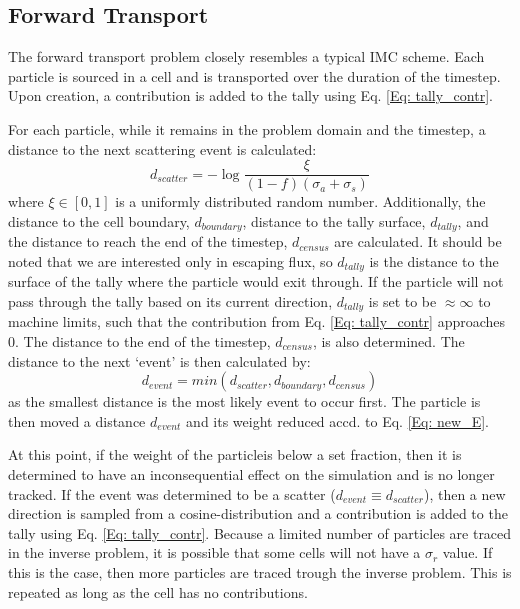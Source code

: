 \subsection{Forward Transport}
The forward transport problem closely resembles a typical IMC scheme. Each particle is sourced in a cell and is transported over the duration of the timestep. Upon creation, a contribution is added to the tally using Eq. \ref{Eq: tally_contr}. 

For each particle, while it remains in the problem domain and the timestep, a distance to the next scattering event is calculated:
\begin{equation}
d_{scatter} = -\log{\frac{\xi}{(1 - f)(\sigma_{a} + \sigma_{s})}}
\end{equation}
where $\xi \in [0,1]$ is a uniformly distributed random number. Additionally, the distance to the cell boundary, $d_{boundary}$, distance to the tally surface, $d_{tally}$, and the distance to reach the end of the timestep, $d_{census}$ are calculated. It should be noted that we are interested only in escaping flux, so $d_{tally}$ is the distance to the surface of the tally where the particle would exit through. If the particle will not pass through the tally based on its current direction, $d_{tally}$ is set to be $\approx \infty$ to machine limits, such that the contribution from Eq. \ref{Eq: tally_contr} approaches $0$. The distance to the end of the timestep, $d_{census}$, is also determined. The distance to the next `event' is then calculated by:
\begin{equation}
d_{event} = min(d_{scatter}, d_{boundary}, d_{census})
\end{equation}
as the smallest distance is the most likely event to occur first. The particle is then moved a distance $d_{event}$ and its weight reduced accd. to Eq. \ref{Eq: new_E}. 

At this point, if the weight of the particleis below a set fraction, then it is determined to have an inconsequential effect on the simulation and is no longer tracked. If the event was determined to be a scatter ($d_{event} \equiv d_{scatter}$), then a new direction is sampled from a cosine-distribution and a contribution is added to the tally using Eq. \ref{Eq: tally_contr}. Because a limited number of particles are traced in the inverse problem, it is possible that some cells will not have a $\sigma_{r}$ value. If this is the case, then more particles are traced trough the inverse problem. This is repeated as long as the cell has no contributions. 

